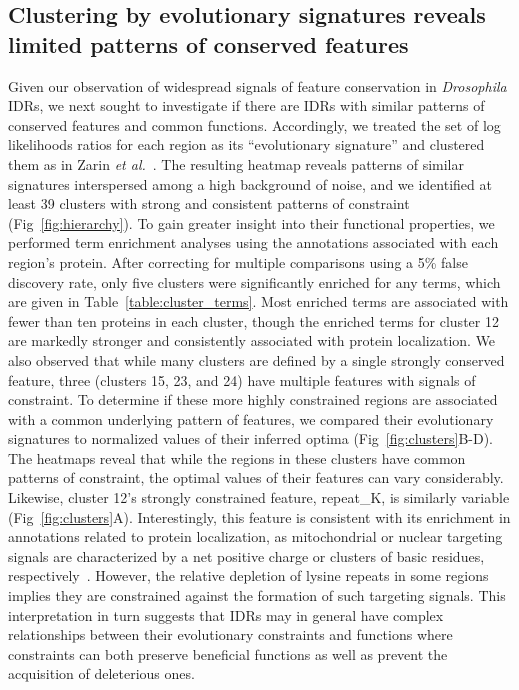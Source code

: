 \subsection{Clustering by evolutionary signatures reveals limited patterns of conserved features}
Given our observation of widespread signals of feature conservation in \textit{Drosophila} IDRs, we next sought to investigate if there are IDRs with similar patterns of conserved features and common functions. Accordingly, we treated the set of log likelihoods ratios for each region as its ``evolutionary signature'' and clustered them as in Zarin \textit{et al.}~\cite{Zarin2019}. The resulting heatmap reveals patterns of similar signatures interspersed among a high background of noise, and we identified at least 39 clusters with strong and consistent patterns of constraint (Fig~\ref{fig:hierarchy}). To gain greater insight into their functional properties, we performed term enrichment analyses using the annotations associated with each region's protein. After correcting for multiple comparisons using a 5\% false discovery rate, only five clusters were significantly enriched for any terms, which are given in Table~\ref{table:cluster_terms}. Most enriched terms are associated with fewer than ten proteins in each cluster, though the enriched terms for cluster 12 are markedly stronger and consistently associated with protein localization. We also observed that while many clusters are defined by a single strongly conserved feature, three (clusters 15, 23, and 24) have multiple features with signals of constraint. To determine if these more highly constrained regions are associated with a common underlying pattern of features, we compared their evolutionary signatures to normalized values of their inferred optima (Fig~\ref{fig:clusters}B-D). The heatmaps reveal that while the regions in these clusters have common patterns of constraint, the optimal values of their features can vary considerably. Likewise, cluster 12's strongly constrained feature, repeat\_K, is similarly variable (Fig~\ref{fig:clusters}A). Interestingly, this feature is consistent with its enrichment in annotations related to protein localization, as mitochondrial or nuclear targeting signals are characterized by a net positive charge or clusters of basic residues, respectively~\cite{Moulin2019, Lu2021}. However, the relative depletion of lysine repeats in some regions implies they are constrained against the formation of such targeting signals. This interpretation in turn suggests that IDRs may in general have complex relationships between their evolutionary constraints and functions where constraints can both preserve beneficial functions as well as prevent the acquisition of deleterious ones.

